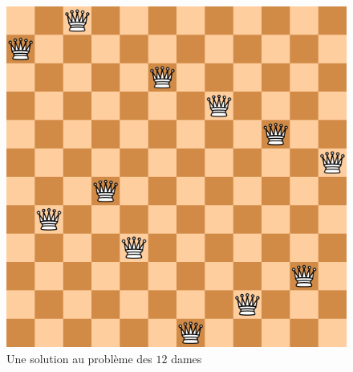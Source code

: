 \documentclass[a4paper,11pt]{article}
\begin{document}
        
        \begin{figure}[t!]
        \centering
        \includegraphics[scale=0.3]{board.png}
        \caption{Une solution au problème des $12$ dames}
        \end{figure}
	
	
\end{document}
